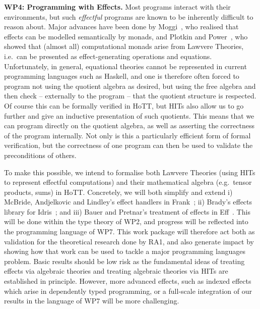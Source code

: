 \documentclass[a4paper,11pt]{article}
\newcommand{\eg}{{e.g.}\ }
\begin{document}
{\bf WP4: Programming with Effects.}
Most programs interact with their environments,
but such \emph{effectful} programs are known to be inherently difficult to
reason about.
Major advances have been done by Moggi~\cite{moggi:monad}, who
realised that effects can be modelled semantically by monads, and
Plotkin and Power~\cite{PlotkinPower:Lawvere}, who showed that (almost
all) computational monads arise from Lawvere Theories, i.e.\ can be
presented as effect-generating operations and equations.
Unfortunately, in general, equational theories cannot be represented
in current programming languages such as Haskell, and one is therefore
often forced to program not using the quotient algebra as desired, but
using the free algebra and then check -- externally to the program --
that the quotient structure is respected.  Of course this can be
formally verified in HoTT, but HITs also allow us to go further and
give an inductive presentation of such quotients. This means that we
can program directly on the quotient algebra, as well as asserting the
correctness of the program %
internally.  Not only is this a particularly efficient form of formal
verification, but the correctness of one program can then be used to
validate the preconditions of others.

To make this possible, we intend to formalise both Lawvere Theories
(using HITs to represent effectful computations) and their
mathematical algebra (e.g.\ tensor products, sums) in HoTT.
Concretely, we will both simplify and extend i) McBride, Andjelkovic
and Lindley's effect handlers in Frank~\cite{conor:frank}; ii) Brady's
effects library for Idris~\cite{brady:effects}; and iii) Bauer and
Pretnar's treatment of effects in Eff~\cite{bauer:eff}.  This will be
done within the type theory of WP2, and progress will be reflected
into the programming language of WP7.  This work package will
therefore act both as validation for the theoretical research done by
RA1, and also generate impact by showing how that work can be used to
tackle a major programming languages problem. Basic results should be
low risk as the fundamental ideas of treating effects via algebraic
theories and treating algebraic theories via HITs are established in
principle. However, more advanced effects, such as indexed effects
which arise in dependently typed programming, or a full-scale
integration of our results in the language of WP7 will be more
challenging.
\end{document}
